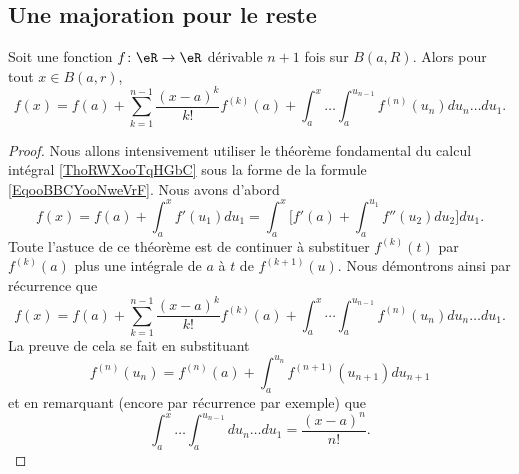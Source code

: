 \subsection{Une majoration pour le reste}

\begin{lemma}       \label{LEMooOVPIooAPWFOm}
	Soit une fonction \( f\colon \eR\to \eR\) dérivable \( n+1\) fois sur \( B(a,R)\). Alors pour tout \( x\in B(a,r)\),
	\begin{equation}
		f(x)=f(a)+\sum_{k=1}^{n-1}\frac{ (x-a)^{k} }{ k! }f^{(k)}(a)+\int_a^{x}\ldots\int_a^{u_{n-1}}f^{(n)}(u_n)du_n\ldots du_1.
	\end{equation}
\end{lemma}

\begin{proof}
	Nous allons intensivement utiliser le théorème fondamental du calcul intégral \ref{ThoRWXooTqHGbC} sous la forme de la formule \eqref{EqooBBCYooNweVrF}. Nous avons d'abord
	\begin{equation}
		f(x)=f(a)+\int_a^x f'(u_1)du_1=\int_a^x\big[ f'(a)+\int_a^{u_1}f''(u_2)du_2 \big]du_1.
	\end{equation}
	Toute l'astuce de ce théorème est de continuer à substituer \( f^{(k)}(t)\) par \( f^{(k)}(a)\) plus une intégrale de \( a\) à \( t\) de \( f^{(k+1)}(u)\). Nous démontrons ainsi par récurrence que
	\begin{equation}        \label{EQooOWJMooHATpMV}
		f(x)=f(a)+\sum_{k=1}^{n-1}\frac{ (x-a)^k }{ k! }f^{(k)}(a)+\int_a^x\cdots\int_a^{u_{n-1}}f^{(n)}(u_n)du_n\ldots du_1.
	\end{equation}
	La preuve de cela se fait en substituant
	\begin{equation}
		f^{(n)}(u_n)=f^{(n)}(a)+\int_{a}^{u_n}f^{(n+1)}(u_{n+1})du_{n+1}
	\end{equation}
	et en remarquant (encore par récurrence par exemple) que
	\begin{equation}
		\int_a^x\ldots \int_a^{u_{n-1}}du_n\ldots du_1=\frac{ (x-a)^n }{ n! }.
	\end{equation}
\end{proof}

